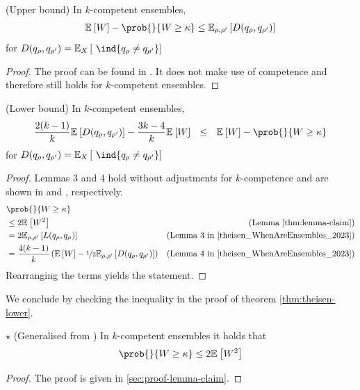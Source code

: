 \documentclass[../main.tex]{subfiles}
\begin{document}
\begin{theorem} 
\label{thm:theisen-upper}
    (Upper bound) In $k$-competent ensembles,
$$
\mathbb{E}_{}\left[ W \right] - \prob{}{W \geq \kappa} \leq \mathbb{E}_{\rho, \rho'}\left[ D(q_{\rho}, q_{\rho'}) \right]  
$$
for $D(q_{\rho}, q_{\rho'}) = \mathbb{E}_{X}\left[ ~\ind{q_{\rho} \not= q_{\rho'}} \right]$
\end{theorem}
\begin{proof}
    The proof can be found in \cite{theisen_WhenAreEnsembles_2023}. It does not make use of competence and therefore still holds for $k$-competent ensembles.
\end{proof}

\begin{theorem} 
\label{thm:theisen-lower}
    (Lower bound) In $k$-competent ensembles,
$$
 \frac{2(k-1)}{k}\mathbb{E}_{}\left[ D(q_{\rho}, q_{\rho'}) \right]  - \frac{3k-4}{k}\mathbb{E}_{}\left[ W \right] 
 ~ ~ \leq ~ ~
\mathbb{E}_{}\left[ W \right] - \prob{}{W \geq \kappa} 
$$
for $D(q_{\rho}, q_{\rho'}) = \mathbb{E}_{X}\left[ ~\ind{q_{\rho} \not= q_{\rho'}} \right]$
\end{theorem}
\begin{proof}
Lemmas 3 and 4 hold without adjustments for $k$-competence and are shown in \cite{cited-by-theisen} and \cite{theisen_WhenAreEnsembles_2023}, respectively.
\begin{align*}
& \prob{}{W \geq \kappa}  \\
& \leq  2 \mathbb{E}_{}\left[ W^2 \right]  & \text{(Lemma \ref{thm:lemma-claim})}   \\
& =  2\mathbb{E}_{\rho, \rho'}\left[ L(q_{\rho}, q_{\rho_{}}) \right]  & \text{(Lemma 3 in \cite{theisen_WhenAreEnsembles_2023})} \\
& = \frac{4(k-1)}{k} \left(  \mathbb{E}_{}\left[ W  \right] - \nicefrac{1}{2} \mathbb{E}_{\rho, \rho'}\left[ D(q_{\rho}, q_{\rho'}) \right]    \right) & \text{(Lemma 4 in \cite{theisen_WhenAreEnsembles_2023})} 
\end{align*}
Rearranging the terms yields the statement.
\end{proof}

We conclude by checking the inequality in the proof of theorem \ref{thm:theisen-lower}.
\begin{lemma} $\star$ (Generalised from \cite{theisen_WhenAreEnsembles_2023}) In $k$-competent ensembles it holds that
\label{thm:lemma-claim}
$$
\prob{}{W \geq \kappa} \leq 2 \mathbb{E}_{}\left[ W^2 \right] 
$$
\end{lemma}
\begin{proof}
    The proof is given in \ref{sec:proof-lemma-claim}.
\end{proof}
\end{document}
